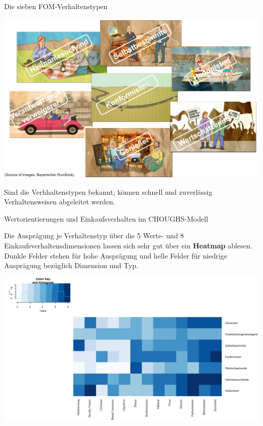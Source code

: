 \documentclass[12pt,ngerman,a4paper,ignorenonframetext,]{beamer}
\begin{document}
\begin{frame}[shrink]{Die sieben FOM-Verhaltenstypen}
\protect\hypertarget{die-sieben-fom-verhaltenstypen}{}

\begin{center}\includegraphics[width=0.8\linewidth]{./images/Marketingcontrolling/Verhaltenstypen} \end{center}

Sind die Verhhaltenstypen bekannt, können schnell und zuverlässig
Verhaltensweisen abgeleitet werden.

\end{frame}

\begin{frame}[shrink]{Wertorientierungen und Einkaufsverhalten im
CHOUGHS-Modell}
\protect\hypertarget{wertorientierungen-und-einkaufsverhalten-im-choughs-modell}{}

Die Ausprägung je Verhaltenstyp über die 5 Werte- und 8
Einkaufsverhaltensdimensionen lassen sich sehr gut über ein
\textbf{Heatmap} ablesen. Dunkle Felder stehen für hohe Ausprägung und
helle Felder für niedrige Ausprägung bezüglich Dimension und Typ.

\begin{center}\includegraphics[width=0.8\linewidth]{./images/Marketingcontrolling/Heatmap} \end{center}

\end{frame}
\end{document}
